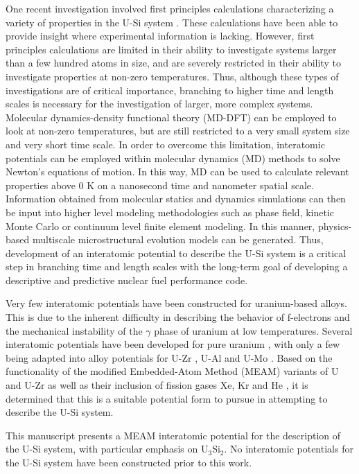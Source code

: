 \documentclass[review]{elsarticle}
\begin{document}
One recent investigation involved first principles calculations characterizing a variety of properties in the U-Si system \cite{noordhoek2016}.  These calculations have been able to provide insight where experimental information is lacking.  However, first principles calculations are limited in their ability to investigate systems larger than a few hundred atoms in size, and are severely restricted in their ability to investigate properties at non-zero temperatures.  Thus, although these types of investigations are of critical importance, branching to higher time and length scales is necessary for the investigation of larger, more complex systems.  Molecular dynamics-density functional theory (MD-DFT) can be employed to look at non-zero temperatures, but are still restricted to a very small system size and very short time scale.  In order to overcome this limitation, interatomic potentials can be employed within molecular dynamics (MD) methods to solve Newton's equations of motion.  In this way, MD can be used to calculate relevant properties above 0 K on a nanosecond time and nanometer spatial scale.  Information obtained from molecular statics and dynamics simulations can then be input into higher level modeling methodologies such as phase field, kinetic Monte Carlo or continuum level finite element modeling.  In this manner, physics-based multiscale microstructural evolution models can be generated.  Thus, development of an interatomic potential to describe the U-Si system is a critical step in branching time and length scales with the long-term goal of developing a descriptive and predictive nuclear fuel performance code.

Very few interatomic potentials have been constructed for uranium-based alloys.  This is due to the inherent difficulty in describing the behavior of f-electrons and the mechanical instability of the $\gamma$ phase of uranium at low temperatures.   Several interatomic potentials have been developed for pure uranium \cite{beeler_meam, beelerASTM, fernandez2014, li2011, smirnova2012, li2012}, with only a few being adapted into alloy potentials for U-Zr \cite{moore2015},  U-Al \cite{pascuet2012} and U-Mo \cite{smirnovaUMo}.  Based on the functionality of the modified Embedded-Atom Method (MEAM) variants of U and U-Zr \cite{beeler_meam, moore2015} as well as their inclusion of fission gases Xe, Kr and He \cite{beelerASTM}, it is determined that this is a suitable potential form to pursue in attempting to describe the U-Si system.  

This manuscript presents a MEAM interatomic potential for the description of the U-Si system, with particular emphasis on U$_{3}$Si$_{2}$.  No interatomic potentials for the U-Si system have been constructed prior to this work.
\end{document}
